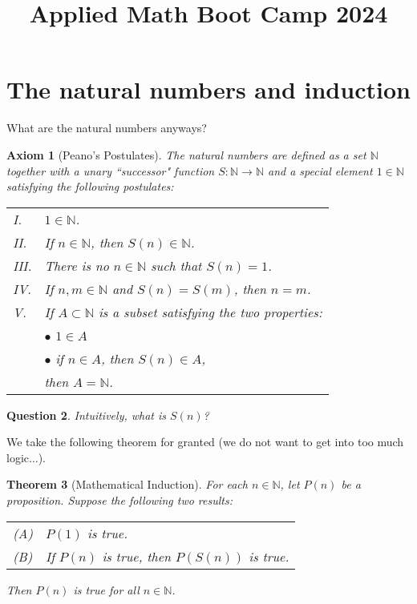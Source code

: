 \documentclass{amsart}
\title{Applied Math Boot Camp 2024}
\newtheorem{theorem}{Theorem}
\newtheorem{axiom}[theorem]{Axiom}
\newtheorem{question}[theorem]{Question}
\newcommand{\1}{\mathds{1}}
\numberwithin{equation}{section}
\numberwithin{theorem}{section}
\begin{document}
\maketitle








\bigskip \section{The natural numbers and induction}

What are the natural numbers anyways?

\begin{axiom}[Peano's Postulates]
The natural numbers are defined as a set $\mathbb N$ together with a unary 
``successor" function $S:{\mathbb N}\rightarrow {\mathbb N}$
and a special element $1\in {\mathbb N}$ satisfying the following postulates:

\begin{tabular}{ll}
I.  & $1\in {\mathbb N}$.  \\

II. &  If $n\in {\mathbb N}$, then $S(n)\in {\mathbb N}$.  \\

III.  &  There is no $n\in {\mathbb N}$ such that $S(n)=1$.  \\

IV.  &  If $n, m\in {\mathbb N}$ and $S(n)=S(m)$, then $n=m$.  \\

V. &  If $A\subset {\mathbb N}$ is a subset satisfying the two properties: \\
& \phantom{MMM}  $\bullet$ $1\in A$ \\

& \phantom{MMM} $\bullet$ if $n\in A$, then $S(n)\in A$, \\

& then $A={\mathbb N}$. \\
\end{tabular}
\end{axiom}


\begin{question}
Intuitively, what is $S(n)$?
\end{question}


We take the following theorem for granted (we do not want to get into too much logic...).
\begin{theorem}[Mathematical Induction]  For each $n\in {\mathbb N}$, let $P(n)$ be a proposition. 
Suppose the following two results:
\begin{center}
\begin{tabular}{ll}
(A) & $P(1)$ is true. \\
(B) & If $P(n)$ is true, then $P(S(n))$ is true. \\
\end{tabular}
\end{center}
Then $P(n)$ is true for all $n \in {\mathbb N}$.
\end{theorem}
\end{document}
